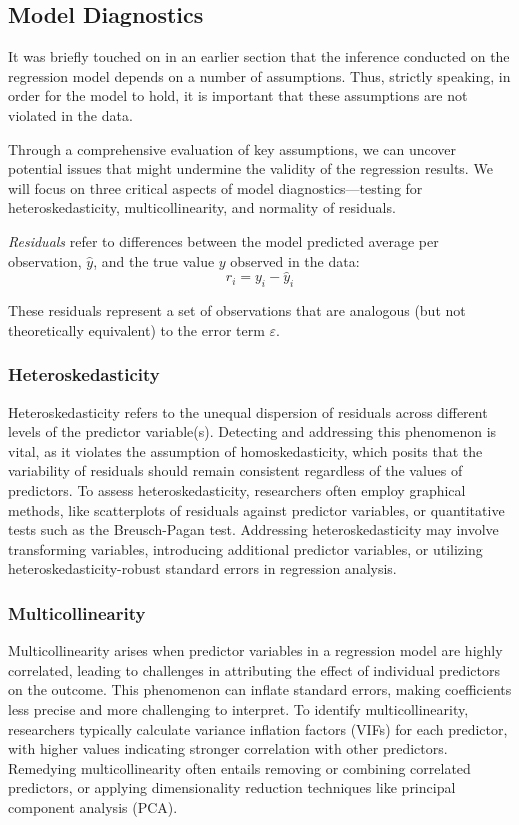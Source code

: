 \documentclass{article}
\begin{document}
\subsection{Model Diagnostics}

It was briefly touched on in an earlier section that the inference conducted on the regression model depends on a number of assumptions. Thus, strictly speaking, in order for the model to hold, it is important that these assumptions are not violated in the data.

Through a comprehensive evaluation of key assumptions, we can uncover potential issues that might undermine the validity of the regression results. We will focus on three critical aspects of model diagnostics—testing for heteroskedasticity, multicollinearity, and normality of residuals.

\textit{Residuals} refer to differences between the model predicted average per observation, $\hat{y}$, and the true value $y$ observed in the data:
$$
r_i = y_i - \hat{y}_i
$$

These residuals represent a set of observations that are analogous (but not theoretically equivalent) to the error term $\varepsilon$.

\subsubsection{Heteroskedasticity}

Heteroskedasticity refers to the unequal dispersion of residuals across different levels of the predictor variable(s). Detecting and addressing this phenomenon is vital, as it violates the assumption of homoskedasticity, which posits that the variability of residuals should remain consistent regardless of the values of predictors. To assess heteroskedasticity, researchers often employ graphical methods, like scatterplots of residuals against predictor variables, or quantitative tests such as the Breusch-Pagan test. Addressing heteroskedasticity may involve transforming variables, introducing additional predictor variables, or utilizing heteroskedasticity-robust standard errors in regression analysis.

\subsubsection{Multicollinearity}

Multicollinearity arises when predictor variables in a regression model are highly correlated, leading to challenges in attributing the effect of individual predictors on the outcome. This phenomenon can inflate standard errors, making coefficients less precise and more challenging to interpret. To identify multicollinearity, researchers typically calculate variance inflation factors (VIFs) for each predictor, with higher values indicating stronger correlation with other predictors. Remedying multicollinearity often entails removing or combining correlated predictors, or applying dimensionality reduction techniques like principal component analysis (PCA).
\end{document}
